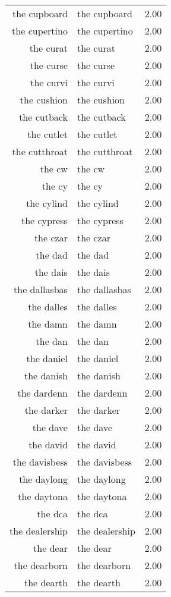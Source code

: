\begin{table}[ht]
\begin{tabular}{rlr}
  the cupboard & the cupboard & 2.00 \\ 
  the cupertino & the cupertino & 2.00 \\ 
  the curat & the curat & 2.00 \\ 
  the curse & the curse & 2.00 \\ 
  the curvi & the curvi & 2.00 \\ 
  the cushion & the cushion & 2.00 \\ 
  the cutback & the cutback & 2.00 \\ 
  the cutlet & the cutlet & 2.00 \\ 
  the cutthroat & the cutthroat & 2.00 \\ 
  the cw & the cw & 2.00 \\ 
  the cy & the cy & 2.00 \\ 
  the cylind & the cylind & 2.00 \\ 
  the cypress & the cypress & 2.00 \\ 
  the czar & the czar & 2.00 \\ 
  the dad & the dad & 2.00 \\ 
  the dais & the dais & 2.00 \\ 
  the dallasbas & the dallasbas & 2.00 \\ 
  the dalles & the dalles & 2.00 \\ 
  the damn & the damn & 2.00 \\ 
  the dan & the dan & 2.00 \\ 
  the daniel & the daniel & 2.00 \\ 
  the danish & the danish & 2.00 \\ 
  the dardenn & the dardenn & 2.00 \\ 
  the darker & the darker & 2.00 \\ 
  the dave & the dave & 2.00 \\ 
  the david & the david & 2.00 \\ 
  the davisbess & the davisbess & 2.00 \\ 
  the daylong & the daylong & 2.00 \\ 
  the daytona & the daytona & 2.00 \\ 
  the dca & the dca & 2.00 \\ 
  the dealership & the dealership & 2.00 \\ 
  the dear & the dear & 2.00 \\ 
  the dearborn & the dearborn & 2.00 \\ 
  the dearth & the dearth & 2.00 \\ 

\end{tabular}
\end{table}
